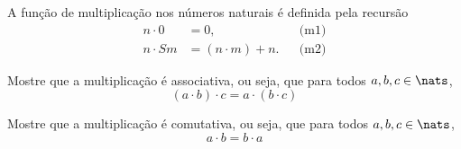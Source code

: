 \begin{definition}[Multiplicação]
	A função de multiplicação nos números naturais é definida pela recursão
	$$
		\begin{aligned}
			n \cdot 0 &= 0, && \text{(m1)}\\
			n \cdot Sm &= (n \cdot m) + n. && \text{(m2)}
		\end{aligned}
	$$
\end{definition}

\begin{exercise}
    Mostre que a multiplicação é associativa, ou seja, que para todos $a,b,c \in \nats$,
    $$
        (a \cdot b) \cdot c = a \cdot (b \cdot c)
    $$
\end{exercise}

\begin{exercise}
    Mostre que a multiplicação é comutativa, ou seja, que para todos $a,b,c \in \nats$,
    $$
        a \cdot b = b \cdot a
    $$
\end{exercise}
